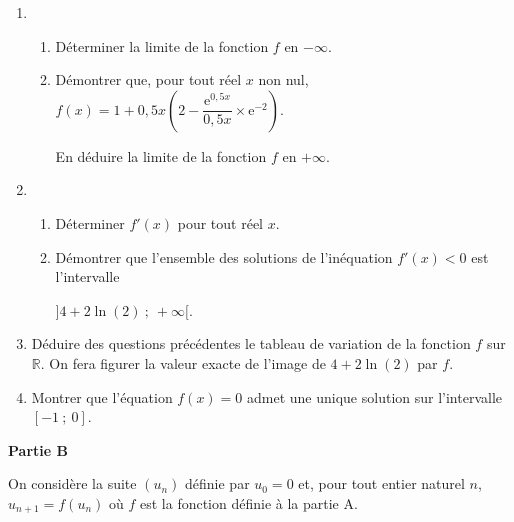 \documentclass[11pt,a4paper,french]{article}
\newcommand{\R}{\mathbb{R}}
\begin{document}
\begin{enumerate}
\item 
	\begin{enumerate}
		\item Déterminer la limite de la fonction $f$ en $- \infty$.
		\item Démontrer que, pour tout réel $x$ non nul, $f(x) = 1+ 0,5x\left(2 - \dfrac{\text{e}^{0,5x}}{0,5x} \times \text{e}^{-2}\right)$.
		
En déduire la limite de la fonction $f$ en $+\infty$. 
	\end{enumerate}
\item 
	\begin{enumerate}
		\item Déterminer $f'(x)$ pour tout réel $x$.
		\item Démontrer que l'ensemble des solutions de l'inéquation $f'(x) < 0$ est l'intervalle 
		
		$]4 + 2\ln (2)~;~+\infty[$.
	\end{enumerate}	
\item Déduire des questions précédentes le tableau de variation de la fonction $f$ sur $\R$. On fera figurer la valeur exacte de l'image de $4 + 2\ln (2)$ par $f$.
\item Montrer que l'équation $f(x) = 0$ admet une unique solution sur l'intervalle $[-1~;~0]$.
\end{enumerate}

\bigskip

\textbf{Partie B}

\medskip

On considère la suite $\left(u_n\right)$ définie par $u_0 = 0$ et, pour tout entier naturel $n$,
\: $u_{n+1} = f\left(u_n\right)$ où $f$ est la fonction définie à la partie A.

\medskip
\end{document}
